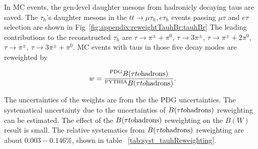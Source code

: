 In MC events, the gen-level daughter mesons from hadronicly decaying taus are saved. 
The $\tau_h$'s daughter mesons in the $tt\to \mu \tau_h, e \tau_h$ events 
passing $\mu \tau$ and $e \tau$ selection are shown
in Fig~\ref{fig:appendix:reweightTauhBr:tauhBr}
The leading contributions to the reconstructed $\tau_h$ are 
$\tau\to \pi^\pm+\pi^0 $, $\tau\to 3\pi^\pm$, $\tau\to \pi^\pm+2\pi^0$, $\tau\to
\pi^\pm$, $\tau\to 3\pi^\pm + \pi^0$. 
MC events with taus in those five decay modes are reweighted by 

\begin{equation}
  w = \frac{^{\rm PDG} B(\tau \to  \rm{hadrons}) }{^{\rm PYTHIA} B( \tau \to \rm{hadrons} )}. 
\end{equation} 


\noindent The uncertainties of the weights are from the the PDG uncertainties. 
The systematical uncertainty due to the uncertainties of $B(\tau \to  \rm{hadrons})$ 
reweighting can be estimated. The effect of the $B(\tau \to  \rm{hadrons})$ 
reweighting on the $B(W)$ result is small. The relative
systematics from $B(\tau \to  \rm{hadrons})$ reweighting are about $0.003 - 0.146 \%$, 
shown in table~ \ref{tab:syst_tauhReweighting}.



\begin{table}[p]
  \centering
  \caption{ Relative systematic uncertainty ($\%$) due to $B(\tau \to  \rm{hadrons})$ reweighting.}
  \setlength{\tabcolsep}{0.5 em}
  \renewcommand{\arraystretch}{2}
  \label{tab:syst_tauhReweighting}
\end{table}
\FloatBarrier
